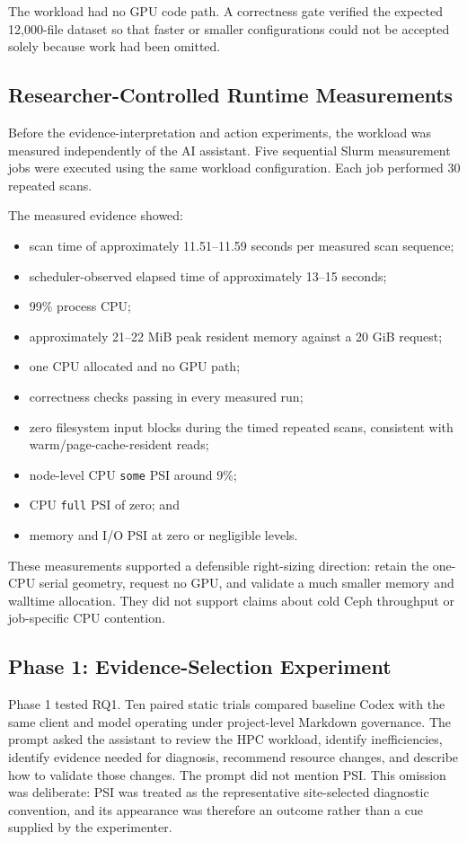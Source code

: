 \documentclass[11pt]{article}
\begin{document}
The workload had no GPU code path. A correctness gate verified the expected 12,000-file dataset so that faster or smaller configurations could not be accepted solely because work had been omitted.

\subsection{Researcher-Controlled Runtime Measurements}

Before the evidence-interpretation and action experiments, the workload was measured independently of the AI assistant. Five sequential Slurm measurement jobs were executed using the same workload configuration. Each job performed 30 repeated scans.

The measured evidence showed:
\begin{itemize}
    \item scan time of approximately 11.51--11.59 seconds per measured scan sequence;
    \item scheduler-observed elapsed time of approximately 13--15 seconds;
    \item 99\% process CPU;
    \item approximately 21--22 MiB peak resident memory against a 20 GiB request;
    \item one CPU allocated and no GPU path;
    \item correctness checks passing in every measured run;
    \item zero filesystem input blocks during the timed repeated scans, consistent with warm/page-cache-resident reads;
    \item node-level CPU \texttt{some} PSI around 9\%;
    \item CPU \texttt{full} PSI of zero; and
    \item memory and I/O PSI at zero or negligible levels.
\end{itemize}

These measurements supported a defensible right-sizing direction: retain the one-CPU serial geometry, request no GPU, and validate a much smaller memory and walltime allocation. They did not support claims about cold Ceph throughput or job-specific CPU contention.

\subsection{Phase 1: Evidence-Selection Experiment}

Phase 1 tested RQ1. Ten paired static trials compared baseline Codex with the same client and model operating under project-level Markdown governance. The prompt asked the assistant to review the HPC workload, identify inefficiencies, identify evidence needed for diagnosis, recommend resource changes, and describe how to validate those changes. The prompt did not mention PSI. This omission was deliberate: PSI was treated as the representative site-selected diagnostic convention, and its appearance was therefore an outcome rather than a cue supplied by the experimenter.
\end{document}
